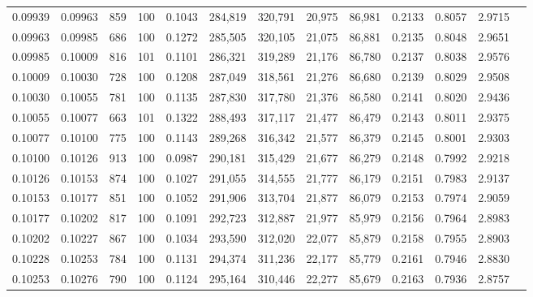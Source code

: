 \begin{tabular}{rrrrrrrrrrrrr}
0.09939 & 0.09963 &   859 & 100 &                                     0.1043 & 284,819 & 320,791 &  20,975 &  86,981 & 0.2133 & 0.8057 & 2.9715 \\
0.09963 & 0.09985 &   686 & 100 &                                     0.1272 & 285,505 & 320,105 &  21,075 &  86,881 & 0.2135 & 0.8048 & 2.9651 \\
0.09985 & 0.10009 &   816 & 101 &                                     0.1101 & 286,321 & 319,289 &  21,176 &  86,780 & 0.2137 & 0.8038 & 2.9576 \\
0.10009 & 0.10030 &   728 & 100 &                                     0.1208 & 287,049 & 318,561 &  21,276 &  86,680 & 0.2139 & 0.8029 & 2.9508 \\
0.10030 & 0.10055 &   781 & 100 &                                     0.1135 & 287,830 & 317,780 &  21,376 &  86,580 & 0.2141 & 0.8020 & 2.9436 \\
0.10055 & 0.10077 &   663 & 101 &                                     0.1322 & 288,493 & 317,117 &  21,477 &  86,479 & 0.2143 & 0.8011 & 2.9375 \\
0.10077 & 0.10100 &   775 & 100 &                                     0.1143 & 289,268 & 316,342 &  21,577 &  86,379 & 0.2145 & 0.8001 & 2.9303 \\
0.10100 & 0.10126 &   913 & 100 &                                     0.0987 & 290,181 & 315,429 &  21,677 &  86,279 & 0.2148 & 0.7992 & 2.9218 \\
0.10126 & 0.10153 &   874 & 100 &                                     0.1027 & 291,055 & 314,555 &  21,777 &  86,179 & 0.2151 & 0.7983 & 2.9137 \\
0.10153 & 0.10177 &   851 & 100 &                                     0.1052 & 291,906 & 313,704 &  21,877 &  86,079 & 0.2153 & 0.7974 & 2.9059 \\
0.10177 & 0.10202 &   817 & 100 &                                     0.1091 & 292,723 & 312,887 &  21,977 &  85,979 & 0.2156 & 0.7964 & 2.8983 \\
0.10202 & 0.10227 &   867 & 100 &                                     0.1034 & 293,590 & 312,020 &  22,077 &  85,879 & 0.2158 & 0.7955 & 2.8903 \\
0.10228 & 0.10253 &   784 & 100 &                                     0.1131 & 294,374 & 311,236 &  22,177 &  85,779 & 0.2161 & 0.7946 & 2.8830 \\
0.10253 & 0.10276 &   790 & 100 &                                     0.1124 & 295,164 & 310,446 &  22,277 &  85,679 & 0.2163 & 0.7936 & 2.8757 \\

\end{tabular}
